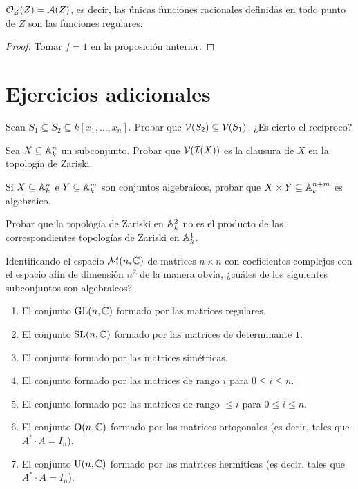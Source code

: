 \documentclass[ACGA.tex]{subfiles}
\begin{document}
\begin{coro}\label{definidatodopunto}
 ${\mathcal O}_Z(Z)={\mathcal A}(Z)$, es decir, las únicas funciones racionales definidas en todo punto de $Z$ son las funciones regulares.
\end{coro}

\begin{proof}
 Tomar $f=1$ en la proposición anterior.
\end{proof}


\section{Ejercicios adicionales}
 
\begin{ejer}\label{contencion} Sean $S_1\subseteq S_2\subseteq k[x_1,\ldots,x_n]$. Probar que $\mathcal{V}(S_2)\subseteq \mathcal{V}(S_1)$. ¿Es cierto el recíproco?
 
\end{ejer}

\begin{ejer}\label{clausura}
 Sea $X\subseteq \mathbb{A}^n_k$ un subconjunto. Probar que $\mathcal{V}(\mathcal{I}(X))$ es la clausura de $X$ en la topología de Zariski.
\end{ejer}

\begin{ejer}\label{productoafin}
 Si $X\subseteq \mathbb{A}^n_k$ e $Y\subseteq \mathbb{A}^m_k$ son conjuntos algebraicos, probar que $X\times Y\subseteq \mathbb{A}^{n+m}_k$ es algebraico.
\end{ejer}

\begin{ejer}
 Probar que la topología de Zariski en $\mathbb{A}^2_k$ no es el producto de las correspondientes topologías de Zariski en $\mathbb{A}^1_k$.
\end{ejer}

\begin{ejer}Identificando el espacio ${\mathcal M}(n,\mathbb{C})$ de matrices $n\times n$ con coeficientes complejos con el espacio afín de dimensión $n^2$ de la manera obvia, ¿cuáles de los siguientes subconjuntos son algebraicos?
 
\begin{enumerate}
 \item El conjunto $\mathrm{GL}(n,\mathbb{C})$ formado por las matrices regulares.
 \item El conjunto $\mathrm{SL}(n,\mathbb{C})$ formado por las matrices de determinante $1$.
 \item El conjunto formado por las matrices simétricas.
 \item El conjunto formado por las matrices de rango $i$ para $0\leq i\leq n$.
 \item El conjunto formado por las matrices de rango $\leq i$ para $0\leq i\leq n$.
 \item El conjunto $\mathrm{O}(n,\mathbb{C})$ formado por las matrices ortogonales (es decir, tales que $A^t\cdot A=I_n$).
 \item El conjunto $\mathrm{U}(n,\mathbb{C})$ formado por las matrices hermíticas (es decir, tales que $A^\ast\cdot A=I_n$).
\end{enumerate}

\end{ejer}
\end{document}
